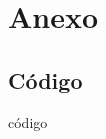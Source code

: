 \documentclass[a4paper,12pt]{article}
\begin{document}

\newpage
\appendix 
\section{Anexo}
\subsection{Código} \label{codigo}
código



\printbibliography[
heading=bibintoc
]
\end{document}
